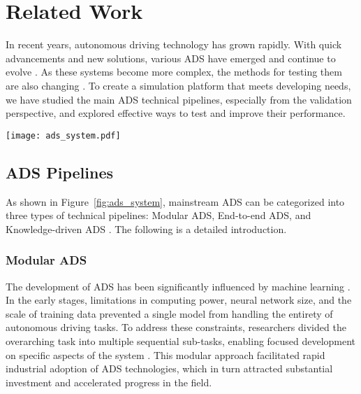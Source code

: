 \section{Related Work}
\label{section:ads}

In recent years, autonomous driving technology has grown rapidly. With quick advancements and new solutions, various ADS have emerged and continue to evolve \citep{zhao2024autonomous}. As these systems become more complex, the methods for testing them are also changing \citep{li2024choose}. To create a simulation platform that meets developing needs, we have studied the main ADS technical pipelines, especially from the validation perspective, and explored effective ways to test and improve their performance.

\begin{figure*}
    \centering
    \texttt{[image: ads\_system.pdf]}
    \caption{\textrm{Multiple technology pipelines for autonomous driving systems.}}
    \label{fig:ads_system}
\end{figure*}

\subsection{ADS Pipelines}

As shown in Figure~\ref{fig:ads_system}, mainstream ADS  can be categorized into three types of technical pipelines: Modular ADS, End-to-end ADS, and Knowledge-driven ADS \citep{chen2024end}. The following is a detailed introduction.

\subsubsection{Modular ADS}


The development of ADS has been significantly influenced by machine learning \citep{huang2020autonomous}. In the early stages, limitations in computing power, neural network size, and the scale of training data prevented a single model from handling the entirety of autonomous driving tasks. To address these constraints, researchers divided the overarching task into multiple sequential sub-tasks, enabling focused development on specific aspects of the system \citep{chen2015deepdriving,maddern20171,bachute2021autonomous}. This modular approach facilitated rapid industrial adoption of ADS technologies, which in turn attracted substantial investment and accelerated progress in the field.

